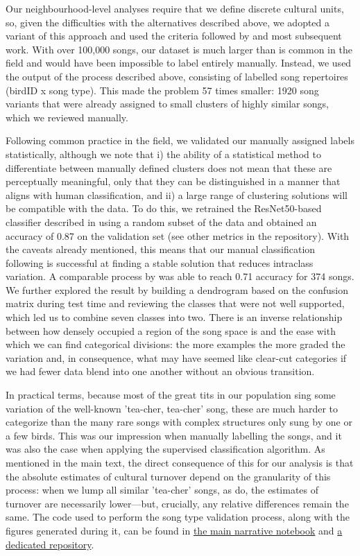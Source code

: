 \documentclass[9pt, twocolumn, twoside]{gsajnl}
\begin{document}
Our neighbourhood-level analyses require that we define discrete cultural units, so, given the difficulties with the alternatives described above, we adopted a variant of this approach and used the criteria followed by \textcite{mcgregor1982b} and most subsequent work. With over 100,000 songs, our dataset is much larger than is common in the field and would have been impossible to label entirely manually. Instead, we used the output of the process described above, consisting of labelled song repertoires (birdID x song type). This made the problem 57 times smaller: 1920 song variants that were already assigned to small clusters of highly similar songs, which we reviewed manually.

Following common practice in the field, we validated our manually assigned labels statistically, although we note that i) the ability of a statistical method to differentiate between manually defined clusters does not mean that these are perceptually meaningful, only that they can be distinguished in a manner that aligns with human classification, and ii) a large range of clustering solutions will be compatible with the data. To do this, we retrained the ResNet50-based classifier described in \textcite{merinorecalde2023} using a random subset of the data and obtained an accuracy of 0.87 on the validation set (see other metrics in the repository). With the caveats already mentioned, this means that our manual classification following \textcite{mcgregor1982b} is successful at finding a stable solution that reduces intraclass variation. A comparable process by \textcite{fayet2014} was able to reach 0.71 accuracy for 374 songs. We further explored the result by building a dendrogram based on the confusion matrix during test time and reviewing the classes that were not well supported, which led us to combine seven classes into two. There is an inverse relationship between how densely occupied a region of the song space is and the ease with which we can find categorical divisions: the more examples the more graded the variation and, in consequence, what may have seemed like clear-cut categories if we had fewer data blend into one another without an obvious transition.

In practical terms, because most of the great tits in our population sing some variation of the well-known 'tea-cher, tea-cher' song, these are much harder to categorize than the many rare songs with complex structures only sung by one or a few birds. This was our impression when manually labelling the songs, and it was also the case when applying the supervised classification algorithm. As mentioned in the main text, the direct consequence of this for our analysis is that the absolute estimates of cultural turnover depend on the granularity of this process: when we lump all similar 'tea-cher' songs, as \textcite{mcgregor1982b} do, the estimates of turnover are necessarily lower---but, crucially, any relative differences remain the same.
The code used to perform the song type validation process, along with the figures generated during it, can be found in \href{https://github.com/nilomr/wytham-songtype-validation/blob/main/notebooks/4_train-model.ipynb}{the main narrative notebook} and \href{https://github.com/nilomr/wytham-songtype-validation}{a dedicated repository}.
\end{document}
